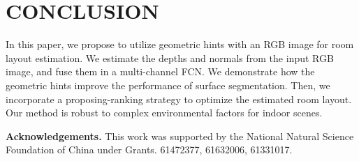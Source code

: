 \section{CONCLUSION}
\label{sec:Con}

In this paper, we propose to utilize geometric hints with an RGB image for room layout estimation. We estimate the depths and normals from the input RGB image, and fuse them in a multi-channel FCN. 
We demonstrate how the geometric hints improve the performance of surface segmentation. 
Then, we incorporate a proposing-ranking strategy to optimize the estimated room layout. 
Our method is robust to complex environmental factors for indoor scenes.

\vspace{0.1cm}
\noindent\textbf{Acknowledgements.} This work was supported by the National Natural Science Foundation of China under Grants. 61472377, 61632006, 61331017.